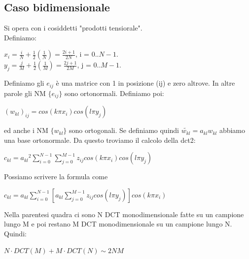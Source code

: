 \documentclass[12pt]{article}
\begin{document}
\subsection{Caso bidimensionale}
Si opera con i cosiddetti "prodotti tensiorale".\\
Definiamo:
\begin{center} 
$x_i = \frac{i}{N} + \frac{1}{2}(\frac{1}{N}) = \frac{2i+1}{2N}$, i = $0..N-1$.\\
$y_j = \frac{j}{M} + \frac{1}{2}(\frac{1}{M}) = \frac{2j+1}{2M}$, j = $0..M-1$.
\end{center}
Definiamo gli $e_{ij}$ \`e una matrice con 1 in posizione (ij) e zero altrove. In altre parole gli NM $\{e_{ij}\}$ sono ortonormali.
Definiamo poi:
\begin{center} $(w_{kl})_{ij} = cos(k{\pi}x_i)cos(l{\pi}y_j)$ \end{center}
ed anche i NM $\{w_{kl}\}$ sono ortogonali.
Se definiamo quindi $\tilde{w_{kl}} = a_{kl}w_{kl}$ abbiamo una base ortonormale.
Da questo troviamo il calcolo della dct2:
\begin{center} $c_{kl} = {a_{kl}}^2\sum_{i=0}^{N-1}\sum_{j=0}^{M-1}z_{ij}cos(k{\pi}x_i)cos(l{\pi}y_j)$ \end{center}
Possiamo scrivere la formula come
\begin{center} $c_{kl} = a_{kl}\sum_{i=0}^{N-1}[a_{kl}\sum_{j=0}^{M-1}z_{ij}cos(l{\pi}y_j)]cos(k{\pi}x_i)$ \end{center}
Nella parentesi quadra ci sono N DCT monodimensionale fatte su un campione lungo M e poi restano M DCT monodimensionale su un campione lungo N.
Quindi:
\begin{center} $N \cdot DCT(M) + M \cdot DCT(N) \sim 2NM$ \end{center}
\end{document}
